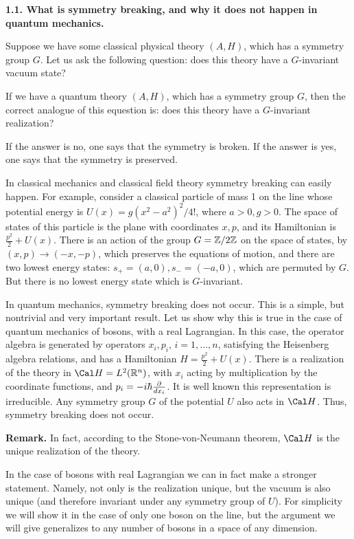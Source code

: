 {\bf 1.1. What is symmetry breaking, and why it does not happen in 
quantum mechanics.}

Suppose we have some classical
physical theory $(A,H)$, which has a symmetry group $G$. 
Let us ask the following question: does this theory have 
a $G$-invariant vacuum state?

If we have a quantum theory $(A,H)$, which has a symmetry group $G$, then 
the correct analogue of this equestion is: does this theory have 
a $G$-invariant realization?

If the answer is no, one says that the symmetry is broken. 
If the answer is yes, one says that the symmetry is preserved. 

In classical mechanics and classical field theory symmetry breaking 
can easily happen. For example, consider a classical particle of mass 1
on the line whose potential energy is $U(x)=g(x^2-a^2)^2/4!$, where
$a>0,g>0$. The space of states of this particle is the plane 
with coordinates $x,p$, and its Hamiltonian is $\frac{p^2}{2}+U(x)$. 
There is an action of the group $G=\Bbb Z/2\Bbb Z$ on the space of states, by
$(x,p)\to (-x,-p)$, which preserves the equations of motion, and there are 
two lowest energy states: $s_+=(a,0),s_-=(-a,0)$, which 
are permuted by $G$. But 
there is no lowest energy state which is $G$-invariant.

In quantum mechanics,
symmetry breaking does not occur. This is a simple, 
but nontrivial and very important result. Let us show why this is true in the 
case of quantum mechanics of bosons, with a real Lagrangian. 
In this case, the operator algebra is generated by operators
$x_i,p_i$, $i=1,...,n$, satisfying the Heisenberg algebra relations, and 
has a Hamiltonian $H=\frac{p^2}{2}+U(x)$.   
There is a realization of the theory in $\Cal H=L^2(\R^n)$, with $x_i$ acting 
by multiplication by the coordinate functions, and 
$p_i=-i\hbar\frac{\partial}{d x_i}$. 
It is well known this representation is irreducible.
Any symmetry group $G$ of the potential $U$ also acts in $\Cal H$. Thus, 
symmetry breaking does not occur. 

{\bf Remark.} In fact, according to the Stone-von-Neumann theorem, 
$\Cal H$ is the unique realization of the theory. 

In the case of bosons with real Lagrangian we can in fact make a stronger 
statement. Namely, not only is the realization unique, but the vacuum 
is also unique (and therefore invariant under any symmetry group of $U$).  
For simplicity we will show it in the case of only one boson
on the line, but the argument 
we will give generalizes to any number of bosons in a space of any dimension. 

